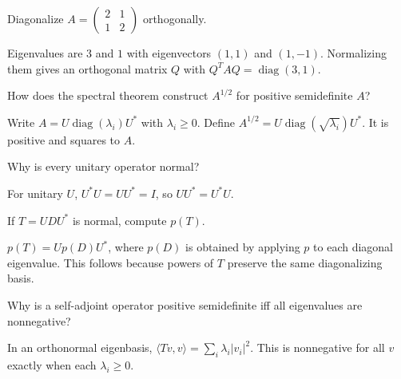 \begin{problem}\label{prob:i16-problem-04}
Diagonalize $A=\begin{pmatrix}2&1\\1&2\end{pmatrix}$ orthogonally.
\end{problem}
\begin{solution}
Eigenvalues are $3$ and $1$ with eigenvectors $(1,1)$ and $(1,-1)$. Normalizing them gives an orthogonal matrix $Q$ with $Q^TAQ=\operatorname{diag}(3,1)$.
\end{solution}

\begin{problem}\label{prob:i16-problem-05}
How does the spectral theorem construct $A^{1/2}$ for positive semidefinite $A$?
\end{problem}
\begin{solution}
Write $A=U\operatorname{diag}(\lambda_i)U^*$ with $\lambda_i\ge0$. Define $A^{1/2}=U\operatorname{diag}(\sqrt{\lambda_i})U^*$. It is positive and squares to $A$.
\end{solution}

\begin{problem}\label{prob:i16-problem-06}
Why is every unitary operator normal?
\end{problem}
\begin{solution}
For unitary $U$, $U^*U=UU^*=I$, so $UU^*=U^*U$.
\end{solution}

\begin{problem}\label{prob:i16-problem-07}
If $T=UDU^*$ is normal, compute $p(T)$.
\end{problem}
\begin{solution}
$p(T)=Up(D)U^*$, where $p(D)$ is obtained by applying $p$ to each diagonal eigenvalue. This follows because powers of $T$ preserve the same diagonalizing basis.
\end{solution}

\begin{problem}\label{prob:i16-problem-08}
Why is a self-adjoint operator positive semidefinite iff all eigenvalues are nonnegative?
\end{problem}
\begin{solution}
In an orthonormal eigenbasis, $\langle Tv,v\rangle=\sum_i\lambda_i|v_i|^2$. This is nonnegative for all $v$ exactly when each $\lambda_i\ge0$.
\end{solution}

